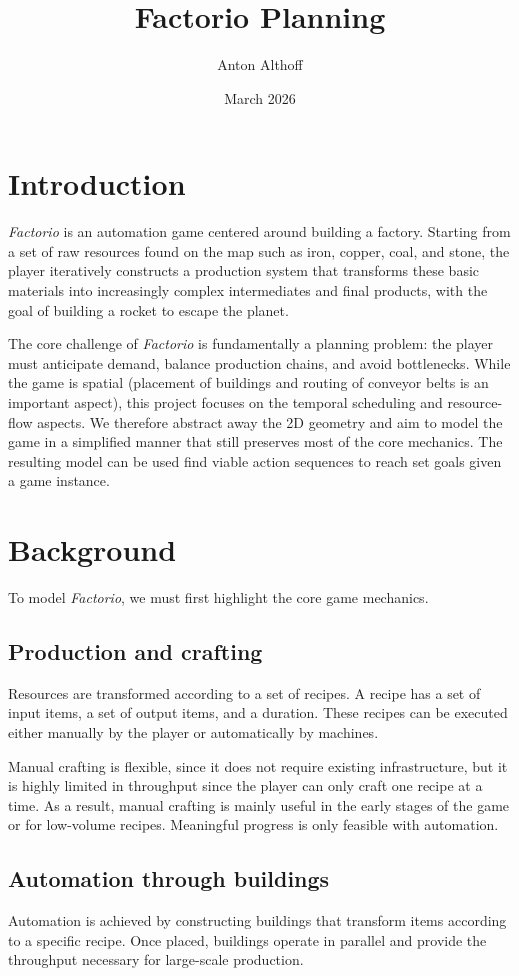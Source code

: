 \documentclass{article}
\title{Factorio Planning}
\author{Anton Althoff}
\date{March 2026}
\newcommand{\factorio}[1]{\textit{#1}}
\begin{document}
\maketitle

\section{Introduction}
\factorio{Factorio} is an automation game centered around building a factory. Starting from a set of raw resources found on the map such as iron, copper, coal, and stone, the player iteratively constructs a production system that transforms these basic materials into increasingly complex intermediates and final products, with the goal of building a rocket to escape the planet.

The core challenge of \factorio{Factorio} is fundamentally a planning problem: the player must anticipate demand, balance production chains, and avoid bottlenecks. While the game is spatial (placement of buildings and routing of conveyor belts is an important aspect), this project focuses on the temporal scheduling and resource-flow aspects. We therefore abstract away the 2D geometry and aim to model the game in a simplified manner that still preserves most of the core mechanics. The resulting model can be used find viable action sequences to reach set goals given a game instance. 

\section{Background}
To model \textit{Factorio}, we must first highlight the core game mechanics.
\subsection{Production and crafting}
Resources are transformed according to a set of recipes. A recipe has a set of input items, a set of output items, and a duration. These recipes can be executed either manually by the player or automatically by machines.

Manual crafting is flexible, since it does not require existing infrastructure, but it is highly limited in throughput since the player can only craft one recipe at a time. As a result, manual crafting is mainly useful in the early stages of the game or for low-volume recipes. Meaningful progress is only feasible with automation.

\subsection{Automation through buildings}
Automation is achieved by constructing buildings that transform items according to a specific recipe. Once placed, buildings operate in parallel and provide the throughput necessary for large-scale production.
\end{document}
